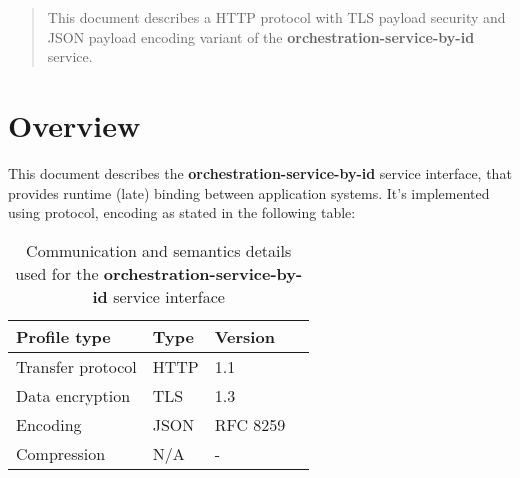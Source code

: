\documentclass[a4paper]{arrowhead}
\begin{document}
\ArrowheadDate{\today}
\ArrowheadSetup

\begin{center}
  \vspace*{1cm}
  \huge{\arrowtitle}

  \vspace*{0.2cm}
  \LARGE{\arrowtype}
  \vspace*{1cm}
\end{center}

  \vspace*{\fill}


  \vspace*{1cm}
  \vspace*{\fill}

  \begin{abstract}
    This document describes a HTTP protocol with TLS payload
    security and JSON payload encoding variant of the \textbf{orchestration-service-by-id} service.
  \end{abstract}
  \vspace*{1cm}

\newpage

\tableofcontents
\newpage

\section{Overview}
\label{sec:overview}

This document describes the \textbf{orchestration-service-by-id} service interface, that provides runtime (late) binding between application systems. It's implemented using protocol, encoding as stated in the following table:

\begin{table}[ht!]
  \centering
  \begin{tabular}{|l|l|l|l|}
    \rowcolor{gray!33} Profile type & Type & Version \\ \hline
    Transfer protocol & HTTP & 1.1 \\ \hline
    Data encryption & TLS & 1.3 \\ \hline
    Encoding & JSON & RFC 8259 \cite{rfc8259} \\ \hline
    Compression & N/A & - \\ \hline
  \end{tabular}
  \caption{Communication and semantics details used for the \textbf{orchestration-service-by-id}
    service interface}
  \label{tab:comunication_semantics_profile}
\end{table}
\end{document}
